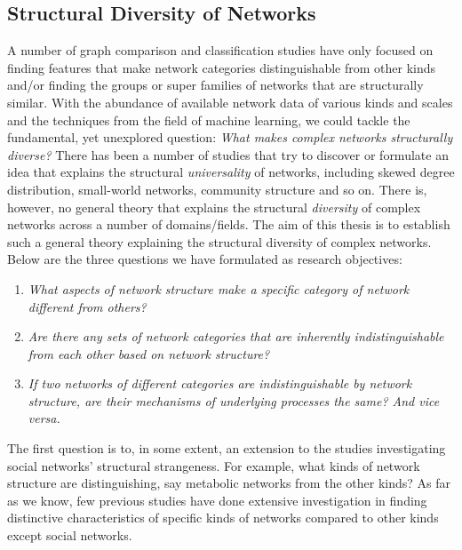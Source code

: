 \documentclass{article}
\begin{document}
	\subsection{Structural Diversity of Networks}
	A number of graph comparison and classification studies have only focused on finding features that make network categories distinguishable from other kinds and/or finding the groups or super families of networks that are structurally similar. 
	With the abundance of available network data of various kinds and scales and the techniques from the field of machine learning, we could tackle the fundamental, yet unexplored question: \textit{What makes complex networks structurally diverse?} There has been a number of studies that try to discover or formulate an idea that explains the structural \textit{universality} of networks, including skewed degree distribution, small-world networks, community structure and so on. There is, however, no general theory that explains the structural \textit{diversity} of complex networks across a number of domains/fields. The aim of  this thesis is to establish such a general theory explaining the structural diversity of complex networks. Below are the three  questions we have formulated as research objectives:


\begin{enumerate}
	\item \textit{What aspects of network structure make a specific category of network different from others?}
	\item \textit{Are there any sets of network categories that are inherently indistinguishable from each other based on network structure?} 
	\item \textit{If two networks of different categories are indistinguishable by network structure, are their mechanisms of underlying processes the same? And vice versa.}
\end{enumerate}

The first question is to, in some extent, an extension to the studies investigating social networks' structural strangeness. For example, what kinds of network structure are distinguishing, say metabolic networks from the other kinds? As far as we know, few previous studies have done extensive investigation in finding distinctive characteristics of specific kinds of networks compared to other kinds except social networks.
\end{document}
